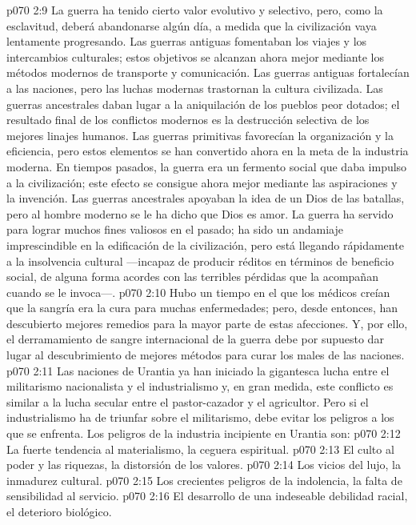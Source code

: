\vs p070 2:9 \pc La guerra ha tenido cierto valor evolutivo y selectivo, pero, como la esclavitud, deberá abandonarse algún día, a medida que la civilización vaya lentamente progresando. Las guerras antiguas fomentaban los viajes y los intercambios culturales; estos objetivos se alcanzan ahora mejor mediante los métodos modernos de transporte y comunicación. Las guerras antiguas fortalecían a las naciones, pero las luchas modernas trastornan la cultura civilizada. Las guerras ancestrales daban lugar a la aniquilación de los pueblos peor dotados; el resultado final de los conflictos modernos es la destrucción selectiva de los mejores linajes humanos. Las guerras primitivas favorecían la organización y la eficiencia, pero estos elementos se han convertido ahora en la meta de la industria moderna. En tiempos pasados, la guerra era un fermento social que daba impulso a la civilización; este efecto se consigue ahora mejor mediante las aspiraciones y la invención. Las guerras ancestrales apoyaban la idea de un Dios de las batallas, pero al hombre moderno se le ha dicho que Dios es amor. La guerra ha servido para lograr muchos fines valiosos en el pasado; ha sido un andamiaje imprescindible en la edificación de la civilización, pero está llegando rápidamente a la insolvencia cultural ---incapaz de producir réditos en términos de beneficio social, de alguna forma acordes con las terribles pérdidas que la acompañan cuando se le invoca---.
\vs p070 2:10 Hubo un tiempo en el que los médicos creían que la sangría era la cura para muchas enfermedades; pero, desde entonces, han descubierto mejores remedios para la mayor parte de estas afecciones. Y, por ello, el derramamiento de sangre internacional de la guerra debe por supuesto dar lugar al descubrimiento de mejores métodos para curar los males de las naciones.
\vs p070 2:11 Las naciones de Urantia ya han iniciado la gigantesca lucha entre el militarismo nacionalista y el industrialismo y, en gran medida, este conflicto es similar a la lucha secular entre el pastor\hyp{}cazador y el agricultor. Pero si el industrialismo ha de triunfar sobre el militarismo, debe evitar los peligros a los que se enfrenta. Los peligros de la industria incipiente en Urantia son:
\vs p070 2:12 La fuerte tendencia al materialismo, la ceguera espiritual.
\vs p070 2:13 El culto al poder y las riquezas, la distorsión de los valores.
\vs p070 2:14 Los vicios del lujo, la inmadurez cultural.
\vs p070 2:15 Los crecientes peligros de la indolencia, la falta de sensibilidad al servicio.
\vs p070 2:16 El desarrollo de una indeseable debilidad racial, el deterioro biológico.
